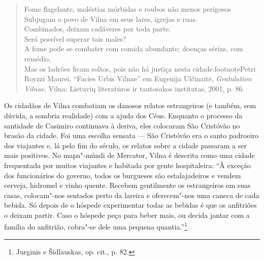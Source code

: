 \begin{verse}
Fome flagelante, moléstias mórbidas e roubos não \qb{}menos perigosos\\
Subjugam o povo de Vilna em seus lares, igrejas e \qb{}ruas.\\
Combinados, deixam cadáveres por toda parte.\\
Será possível superar tais males?\\
A fome pode se combater com comida abundante; \qb{}doenças sérias, com
remédio,\\
Mas os ladrões ficam soltos, pois não há justiça \qb{}nesta cidade.footnote{Petri Royzzi Maurei, ``Facies Urbis Vilnae'' em Eugenija Ulčinaitė, \textit{Gratulation Vilnae}. Vilna: Lietuvių literatūros ir tautosakos institutas, 2001, p. 86.} 
\end{verse}

%

\asterisc

Os cidadãos de Vilna combatiam os danosos relatos estrangeiros (e
também, sem dúvida, a sombria realidade) com a ajuda dos Céus. Enquanto
o processo da santidade de Casimiro continuava à deriva, eles colocaram
São Cristóvão no brasão da cidade. Foi uma escolha sensata --- São
Cristóvão era o santo padroeiro dos viajantes e, lá pelo fim do século,
os relatos sobre a cidade passaram a ser mais positivos. No mapa"-múndi
de Mercator, Vilna é descrita como uma cidade frequentada por muitos
viajantes e habitada por gente hospitaleira: ``À exceção dos
funcionários do governo, todos os burgueses são estalajadeiros e vendem
cerveja, hidromel e vinho quente. Recebem gentilmente os estrangeiros em
suas casas, colocam"-nos sentados perto da lareira e oferecem"-nos uma
caneca de cada bebida. Só depois de o hóspede experimentar todas as
bebidas é que os anfitriões o deixam partir. Caso o hóspede peça para
beber mais, ou decida jantar com a família do anfitrião, cobra"-se dele
uma pequena quantia.''\footnote{Jurginis e Šidlauskas, op. cit., p. 82.}


